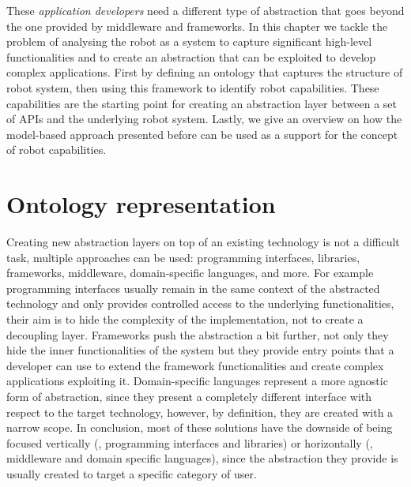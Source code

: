These \textit{application developers} need a different type of abstraction that goes beyond the one provided by middleware and frameworks. In this chapter we tackle the problem of analysing the robot as a system to capture significant high-level functionalities and to create an abstraction that can be exploited to develop complex applications. First by defining an ontology that captures the structure of robot system, then using this framework to identify robot capabilities. These capabilities are the starting point for creating an abstraction layer between a set of APIs and the underlying robot system. Lastly, we give an overview on how the model-based approach presented before can be used as a support for the concept of robot capabilities.

\minitoc
\newpage

\section{Ontology representation}
\label{sec:onto}
Creating new abstraction layers on top of an existing technology is not a difficult task, multiple approaches can be used: programming interfaces, libraries, frameworks, middleware, domain-specific languages, and more. For example programming interfaces usually remain in the same context of the abstracted technology and only provides controlled access to the underlying functionalities, their aim is to hide the complexity of the implementation, not to create a decoupling layer. 
Frameworks push the abstraction a bit further, not only they hide the inner functionalities of the system but they provide entry points that a developer can use to extend the framework functionalities and create complex applications exploiting it.
Domain-specific languages represent a more agnostic form of abstraction, since they present a completely different interface with respect to the target  technology, however, by definition, they are created with a narrow scope. In conclusion, most of these solutions have the downside of being focused vertically (\eg, programming interfaces and libraries) or horizontally (\eg, middleware and domain specific languages), since the abstraction they provide is usually created to target a specific category of user.

